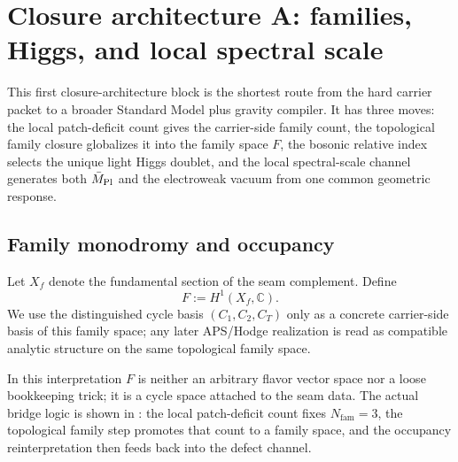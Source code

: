 \section{Closure architecture A: families, Higgs, and local spectral scale}

This first closure-architecture block is the shortest route from the hard carrier packet to a broader Standard Model plus gravity compiler. It has three moves: the local patch-deficit count gives the carrier-side family count, the topological family closure globalizes it into the family space $F$, the bosonic relative index selects the unique light Higgs doublet, and the local spectral-scale channel generates both $\bar M_{\mathrm{Pl}}$ and the electroweak vacuum from one common geometric response.

\subsection{Family monodromy and occupancy}

\begin{definition}
Let $X_f$ denote the fundamental section of the seam complement. Define
\[
F:=H^1(X_f,\mathbb C).
\]
We use the distinguished cycle basis $(C_1,C_2,C_T)$ only as a concrete carrier-side basis of this family space; any later APS/Hodge realization is read as compatible analytic structure on the same topological family space.
\end{definition}
In this interpretation $F$ is neither an arbitrary flavor vector space nor a loose bookkeeping trick; it is a cycle space attached to the seam data. The actual bridge logic is shown in : the local patch-deficit count fixes $N_{\mathrm{fam}}=3$, the topological family step promotes that count to a family space, and the occupancy reinterpretation then feeds back into the defect channel.

